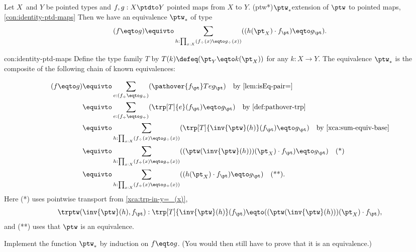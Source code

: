 \begin{construction}\label{con:identity-ptd-maps}
Let $X$ and $Y$ be pointed types and
$f,g: X\ptdto Y$ pointed maps from $X$ to $Y$.
\glossary(ptw*){$\protect\ptw_*$}{extension of $\protect\ptw$ to pointed maps, \cref{con:identity-ptd-maps}}
Then we have an equivalence $\ptw_*$ of type 
\[
(f\eqto g) \equivto
\sum_{h:\prod_{x:X}(f_\div(x)\eqto g_\div(x))}
                               ((h(\pt_X)\cdot f_\pt) \eqto g_\pt ).
\]
\end{construction}

\begin{implementation}{con:identity-ptd-maps}
Define the type family $T$
by $T(k) \defeq (\pt_Y\eqto k(\pt_X))$ for any $k: X\to Y$.
The equivalence $\ptw_*$ is the composite of the following
chain of known equivalences:
\begin{marginfigure}
  \caption{Transport in $T$.} 
\end{marginfigure}
\begin{align*}
(f\eqto g) &\equivto 
\sum_{e: (f_\div\eqto g_\div)}(\pathover {f_\pt} T e {g_\pt})
\quad \text{by \cref{lem:isEq-pair=}}\\
           &\equivto 
\sum_{e: (f_\div\eqto g_\div)}(\trp[T]{e}(f_\pt) \eqto g_\pt )
\quad\text{by \cref{def:pathover-trp}}\\
&\equivto 
\sum_{h:\prod_{x:X}(f_\div(x)\eqto g_\div(x))}(\trp[T]{\inv{\ptw}(h)}(f_\pt) \eqto g_\pt )\quad\text{by \cref{xca:sum-equiv-base}}\\
&\equivto 
\sum_{h:\prod_{x:X}(f_\div(x)\eqto g_\div(x))}((\ptw(\inv{\ptw}(h)))(\pt_X)\cdot f_\pt) \eqto g_\pt )\quad \text{(*)}\\
&\equivto 
\sum_{h:\prod_{x:X}(f_\div(x)\eqto g_\div(x))}((h(\pt_X)\cdot f_\pt) \eqto g_\pt )\quad \text{(**).}
\end{align*}
Here (*) uses pointwise transport from \cref{xca:trp-in-y=_(x)},
\[ \trptw(\inv{\ptw}(h),f_\pt):\trp[T]{\inv{\ptw}(h)}(f_\pt)\eqto
 ((\ptw(\inv{\ptw}(h)))(\pt_X)\cdot f_\pt),
 \] 
and (**) uses that $\ptw$ is an equivalence.
\end{implementation}

\begin{xca}\label{xca:identity-ptd-maps}
Implement the function $\ptw_*$ by induction on $f\eqto g$.
(You would then still have to prove that it is an equivalence.)
\end{xca}

